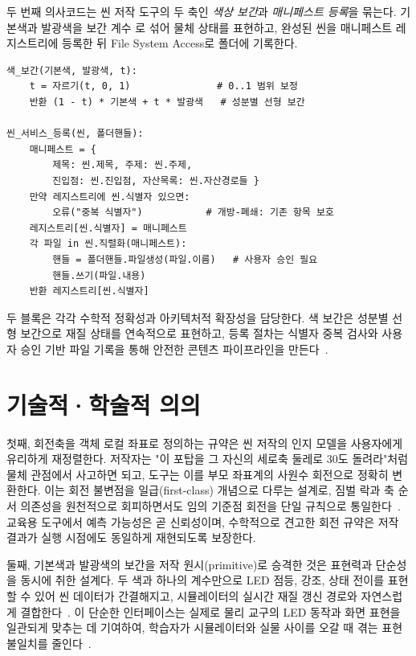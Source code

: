 두 번째 의사코드는 씬 저작 도구의 두 축인 \emph{색상 보간}과 \emph{매니페스트 등록}을 묶는다. 기본색과 발광색을 보간 계수 로 섞어 물체 상태를 표현하고, 완성된 씬을 매니페스트 레지스트리에 등록한 뒤 File System Access로 폴더에 기록한다.

\begin{verbatim}
색_보간(기본색, 발광색, t):
    t = 자르기(t, 0, 1)               # 0..1 범위 보정
    반환 (1 - t) * 기본색 + t * 발광색   # 성분별 선형 보간

씬_서비스_등록(씬, 폴더핸들):
    매니페스트 = {
        제목: 씬.제목, 주제: 씬.주제,
        진입점: 씬.진입점, 자산목록: 씬.자산경로들 }
    만약 레지스트리에 씬.식별자 있으면:
        오류("중복 식별자")           # 개방-폐쇄: 기존 항목 보호
    레지스트리[씬.식별자] = 매니페스트
    각 파일 in 씬.직렬화(매니페스트):
        핸들 = 폴더핸들.파일생성(파일.이름)   # 사용자 승인 필요
        핸들.쓰기(파일.내용)
    반환 레지스트리[씬.식별자]
\end{verbatim}

두 블록은 각각 수학적 정확성과 아키텍처적 확장성을 담당한다. 색 보간은 성분별 선형 보간으로 재질 상태를 연속적으로 표현하고, 등록 절차는 식별자 중복 검사와 사용자 승인 기반 파일 기록을 통해 안전한 콘텐츠 파이프라인을 만든다~\cite{martin2008cleancode}.

\section{기술적·학술적 의의}

첫째, 회전축을 객체 로컬 좌표로 정의하는 규약은 씬 저작의 인지 모델을 사용자에게 유리하게 재정렬한다. 저작자는 "이 포탑을 그 자신의 세로축 둘레로 30도 돌려라"처럼 물체 관점에서 사고하면 되고, 도구는 이를 부모 좌표계의 사원수 회전으로 정확히 변환한다. 이는 회전 불변점을 일급(first-class) 개념으로 다루는 설계로, 짐벌 락과 축 순서 의존성을 원천적으로 회피하면서도 임의 기준점 회전을 단일 규칙으로 통일한다~\cite{akenine2018realtime,threejs}. 교육용 도구에서 예측 가능성은 곧 신뢰성이며, 수학적으로 견고한 회전 규약은 저작 결과가 실행 시점에도 동일하게 재현되도록 보장한다.

둘째, 기본색과 발광색의 보간을 저작 원시(primitive)로 승격한 것은 표현력과 단순성을 동시에 취한 설계다. 두 색과 하나의 계수만으로 LED 점등, 강조, 상태 전이를 표현할 수 있어 씬 데이터가 간결해지고, 시뮬레이터의 실시간 재질 갱신 경로와 자연스럽게 결합한다~\cite{webgl,gltf}. 이 단순한 인터페이스는 실제로 물리 교구의 LED 동작과 화면 표현을 일관되게 맞추는 데 기여하여, 학습자가 시뮬레이터와 실물 사이를 오갈 때 겪는 표현 불일치를 줄인다~\cite{norman2013design}.

